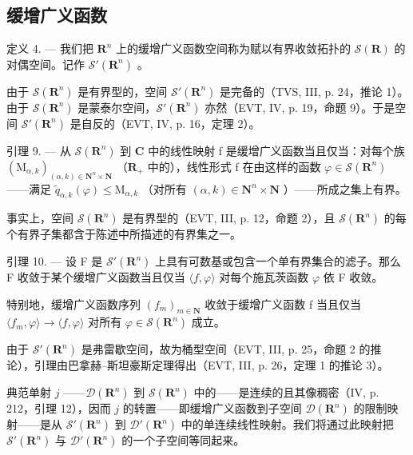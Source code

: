 \subsection{缓增广义函数}

定义 4. --- 我们把 \(\mathbf{R}^{n}\) 上的缓增广义函数空间称为赋以有界收敛拓扑的 \(\mathcal{S}(\mathbf{R})\) 的对偶空间。记作 \(\mathcal{S}'(\mathbf{R}^{n})\) 。

由于 \(\mathcal{S}(\mathbf{R}^n)\) 是有界型的，空间 \(\mathcal{S}'(\mathbf{R}^n)\) 是完备的（TVS, III, p. 24，推论 1）。由于 \(\mathcal{S}(\mathbf{R}^n)\) 是蒙泰尔空间，\(\mathcal{S}'(\mathbf{R}^n)\) 亦然（EVT, IV, p. 19，命题 9）。于是空间 \(\mathcal{S}'(\mathbf{R}^n)\) 是自反的（EVT, IV, p. 16，定理 2）。

引理 9. --- 从 \(\mathcal{S}(\mathbf{R}^{n})\) 到 \(\mathbf{C}\) 中的线性映射 f 是缓增广义函数当且仅当：对每个族 \((\mathrm{M}_{\alpha,k})_{(\alpha,k)\in\mathbf{N}^{n}\times\mathbf{N}}\) （\(\mathbf{R}_{+}\) 中的），线性形式 f 在由这样的函数 \(\varphi\in\mathcal{S}(\mathbf{R}^{n})\) ——满足 \(\widetilde{q}_{\alpha,k}(\varphi)\leqslant\mathrm{M}_{\alpha,k}\) （对所有 \((\alpha,k)\in\mathbf{N}^{n}\times\mathbf{N}\) ）——所成之集上有界。

事实上，空间 \(\mathcal{S}(\mathbf{R}^{n})\) 是有界型的（EVT, III, p. 12，命题 2），且 \(\mathcal{S}(\mathbf{R}^{n})\) 的每个有界子集都含于陈述中所描述的有界集之一。

引理 10. --- 设 F 是 \(\mathcal{S}'(\mathbf{R}^n)\) 上具有可数基或包含一个单有界集合的滤子。那么 F 收敛于某个缓增广义函数当且仅当 \(\langle f, \varphi \rangle\) 对每个施瓦茨函数 \(\varphi\) 依 F 收敛。

特别地，缓增广义函数序列 \((f_{m})_{m\in\mathbf{N}}\) 收敛于缓增广义函数 f 当且仅当 \(\langle f_{m},\varphi\rangle\to\langle f,\varphi\rangle\) 对所有 \(\varphi\in\mathcal{S}(\mathbf{R}^{n})\) 成立。

由于 \(\mathcal{S}'(\mathbf{R}^n)\) 是弗雷歇空间，故为桶型空间（EVT, III, p. 25，命题 2 的推论），引理由巴拿赫–斯坦豪斯定理得出（EVT, III, p. 26，定理 1 的推论 3）。

典范单射 \(j\) ——\(\mathcal{D}(\mathbf{R}^{n})\) 到 \(\mathcal{S}(\mathbf{R}^{n})\) 中的——是连续的且其像稠密（IV, p. 212，引理 12），因而 \(j\) 的转置——即缓增广义函数到子空间 \(\mathcal{D}(\mathbf{R}^{n})\) 的限制映射——是从 \(\mathcal{S}'(\mathbf{R}^{n})\) 到 \(\mathcal{D}'(\mathbf{R}^{n})\) 中的单连续线性映射。我们将通过此映射把 \(\mathcal{S}'(\mathbf{R}^{n})\) 与 \(\mathcal{D}'(\mathbf{R}^{n})\) 的一个子空间等同起来。

